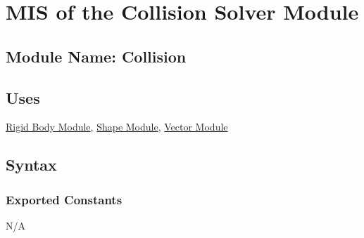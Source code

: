 \documentclass[12pt]{article}
\newcommand{\colDescrip}{0.63\textwidth}
\newcommand{\funcPadding}{1.3}
\newcommand{\newfunc}{\\[1.5em]}
\newcommand{\Z}{$\mathbb{Z}$}
\newcommand{\Body}{\hyperref[MISBody]{Rigid Body Module}}
\newcommand{\Shape}{\hyperref[MISShape]{Shape Module}}
\newcommand{\Vector}{\hyperref[MISVector]{Vector Module}}
\begin{document}
%
%


\section{MIS of the Collision Solver Module} \label{MISCollision}

\subsection{Module Name: Collision}

\subsection{Uses} \label{SecUCollision}
	\Body, \Shape, \Vector \\

\subsection{Syntax}

\subsubsection{Exported Constants} \label{SecECCollision}
N/A
\end{document}

